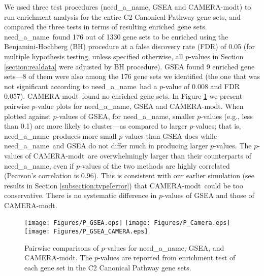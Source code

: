 \documentclass[useAMS,usenatbib, galley]{biom}
\newcommand{\OurMethod}{need\_a\_name}
\newcommand{\CMT}{CAMERA-modt}
\begin{document}
	
	We used three test procedures (\OurMethod, GSEA and \CMT) to run enrichment analysis for the entire C2 Canonical Pathway gene sets, and compared the three tests in terms of resulting enriched gene sets. \OurMethod~found 176 out of 1330 gene sets to be enriched using the Benjamini-Hochberg (BH) procedure at a false discovery rate (FDR) of 0.05 (for multiple hypothesis testing, unless specified otherwise, all $p$-values in Section \ref{section:realdata} were adjusted by BH procedure). GSEA found 9 enriched gene sets---8 of them were also among the 176 gene sets we identified (the one that was not significant according to \OurMethod~had a $p$-value of 0.008 and FDR 0.057). \CMT~found no enriched gene sets. In Figure \ref{fig:HDdatap} we present pairwise $p$-value plots for \OurMethod, GSEA and \CMT. When plotted against $p$-values of GSEA, for \OurMethod, smaller $p$-values (e.g., less than 0.1) are more likely to cluster---as compared to larger $p$-values; that is, \OurMethod~produces more small $p$-values than GSEA does while \OurMethod~and GSEA do not differ much in producing larger $p$-values. The $p$-values of \CMT~are overwhelmingly larger than their counterparts of \OurMethod, even if $p$-values of the two methods are highly correlated (Pearson's correlation is 0.96). This is consistent with our earlier simulation (see results in Section \ref{subsection:typeIerror}) that \CMT~could be too conservative. There is no systematic difference in $p$-values of GSEA and those of \CMT. 
	\begin{figure}
		\begin{center}
			\texttt{[image: Figures/P\_GSEA.eps]}
			\texttt{[image: Figures/P\_Camera.eps]}
			\texttt{[image: Figures/P\_GSEA\_CAMERA.eps]}
		\end{center} 
			\caption{Pairwise comparisons of $p$-values for \OurMethod, GSEA, and \CMT. The $p$-values are reported from enrichment test of each gene set in the C2 Canonical Pathway gene sets. }\label{fig:HDdatap}
	\end{figure} 
	
	
\end{document}
